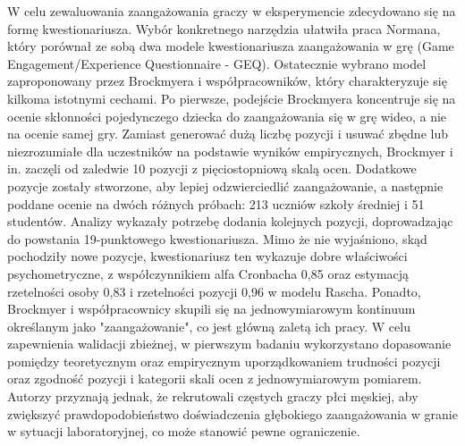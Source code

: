 W celu zewaluowania zaangażowania graczy w eksperymencie zdecydowano się na formę kwestionariusza.
Wybór konkretnego narzędzia ułatwiła praca Normana\cite{geq}, który porównał ze sobą dwa modele kwestionariusza
zaangażowania w grę (Game Engagement/Experience Questionnaire - GEQ)\cite{development_of_game}\cite{game_exp_quest}. Ostatecznie wybrano model
zaproponowany przez Brockmyera i współpracowników\cite{development_of_game}, który charakteryzuje się kilkoma istotnymi cechami.
Po pierwsze, podejście Brockmyera\cite{development_of_game} koncentruje się na ocenie skłonności pojedynczego dziecka do
zaangażowania się w grę wideo, a nie na ocenie samej gry\cite{geq}. Zamiast generować dużą liczbę pozycji i usuwać
zbędne lub niezrozumiałe dla uczestników na podstawie wyników empirycznych, Brockmyer i in.\cite{development_of_game} zaczęli od
zaledwie 10 pozycji z pięciostopniową skalą ocen. Dodatkowe pozycje zostały stworzone, aby lepiej
odzwierciedlić zaangażowanie, a następnie poddane ocenie na dwóch różnych próbach: 213 uczniów szkoły
średniej i 51 studentów. Analizy wykazały potrzebę dodania kolejnych pozycji, doprowadzając do powstania
19-punktowego kwestionariusza. Mimo że nie wyjaśniono, skąd pochodziły nowe pozycje, kwestionariusz ten
wykazuje dobre właściwości psychometryczne\cite{geq}, z współczynnikiem alfa Cronbacha 0,85 oraz estymacją
rzetelności osoby 0,83 i rzetelności pozycji 0,96 w modelu Rascha\cite{development_of_game}. Ponadto, Brockmyer i współpracownicy\cite{development_of_game}
skupili się na jednowymiarowym kontinuum określanym jako "zaangażowanie", co jest główną zaletą ich
pracy\cite{geq}. W celu zapewnienia walidacji zbieżnej, w pierwszym badaniu wykorzystano dopasowanie pomiędzy
teoretycznym oraz empirycznym uporządkowaniem trudności pozycji oraz zgodność pozycji i kategorii skali
ocen z jednowymiarowym pomiarem\cite{geq}. Autorzy przyznają jednak, że rekrutowali częstych graczy płci męskiej,
aby zwiększyć prawdopodobieństwo doświadczenia głębokiego zaangażowania w granie w sytuacji
laboratoryjnej, co może stanowić pewne ograniczenie\cite{geq}.

